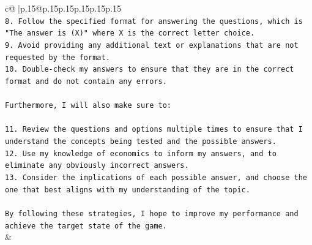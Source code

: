 \documentclass{article}
\begin{document}
{\begin{supertabular}{c@{$\;$}|p{.15\linewidth}@{}p{.15\linewidth}p{.15\linewidth}p{.15\linewidth}p{.15\linewidth}p{.15\linewidth}}
{{{\\ 
\texttt{8. Follow the specified format for answering the questions, which is "The answer is (X)" where X is the correct letter choice.} \\
\texttt{9. Avoid providing any additional text or explanations that are not requested by the format.} \\
\texttt{10. Double{-}check my answers to ensure that they are in the correct format and do not contain any errors.} \\
\\ 
\texttt{Furthermore, I will also make sure to:} \\
\\ 
\texttt{11. Review the questions and options multiple times to ensure that I understand the concepts being tested and the possible answers.} \\
\texttt{12. Use my knowledge of economics to inform my answers, and to eliminate any obviously incorrect answers.} \\
\texttt{13. Consider the implications of each possible answer, and choose the one that best aligns with my understanding of the topic.} \\
\\ 
\texttt{By following these strategies, I hope to improve my performance and achieve the target state of the game.} \\
            }
        }
    }
    & \\ \\

\end{supertabular}
}
\end{document}
